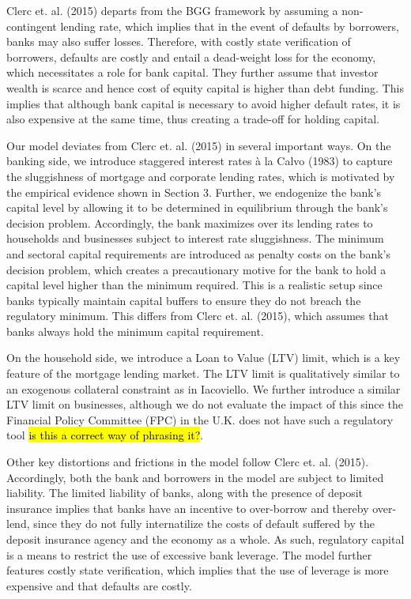 \documentclass[12pt]{article}
\numberwithin{equation}{section}
\begin{document}
Clerc et. al. (2015) departs from the BGG framework by assuming a non-contingent lending rate, which implies that in the event of defaults by borrowers, banks may also suffer losses. Therefore, with costly state verification of borrowers, defaults are costly and entail a dead-weight loss for the economy, which necessitates a role for bank capital. They further assume that investor wealth is scarce and hence cost of equity capital is higher than debt funding. This implies that although bank capital is necessary to avoid higher default rates, it is also expensive at the same time, thus creating a trade-off for holding capital. 

Our model deviates from Clerc et. al. (2015) in several important ways. On the banking side, we introduce staggered interest rates à la Calvo (1983) to capture the sluggishness of mortgage and corporate lending rates, which is motivated by the empirical evidence shown in Section 3. Further, we endogenize the bank's capital level by allowing it to be determined in equilibrium through the bank's decision problem. Accordingly, the bank maximizes over its lending rates to households and businesses subject to interest rate sluggishness. The minimum and sectoral capital requirements are introduced as penalty costs on the bank's decision problem, which creates a precautionary motive for the bank to hold a capital level higher than the minimum required. This is a realistic setup since banks typically maintain capital buffers to ensure they do not breach the regulatory minimum. This differs from Clerc et. al. (2015), which assumes that banks always hold the minimum capital requirement. 


On the household side, we introduce a Loan to Value (LTV) limit, which is a key feature of the mortgage lending market. The LTV limit is qualitatively similar to an exogenous collateral constraint as in Iacoviello. We further introduce a similar LTV limit on businesses, although we do not evaluate the impact of this since the Financial Policy Committee (FPC) in the U.K. does not have such a regulatory tool \hl{is this a correct way of phrasing it?}. 


Other key distortions and frictions in the model follow Clerc et. al. (2015). Accordingly, both the bank and borrowers in the model are subject to limited liability. The limited liability of banks, along with the presence of deposit insurance implies that banks have an incentive to over-borrow and thereby over-lend, since they do not fully internatilize the costs of default suffered by the deposit insurance agency and the economy as a whole. As such, regulatory capital is a means to restrict the use of excessive bank leverage. The model further features costly state verification, which implies that the use of leverage is more expensive and that defaults are costly. 
\end{document}
